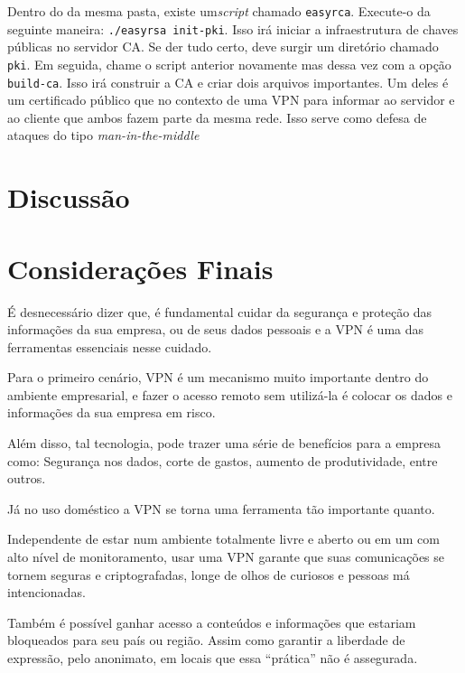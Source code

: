 \documentclass[12pt]{article}
\begin{document}
\begin{flushleft}
Dentro do da mesma pasta, existe um\emph{script} chamado \texttt{easyrca}. Execute-o da seguinte
maneira: \texttt{./easyrsa init-pki}. Isso irá iniciar a infraestrutura de chaves públicas no servidor CA.
Se der tudo certo, deve surgir um diretório chamado \texttt{pki}. Em seguida, chame o script anterior 
novamente mas dessa vez com a opção \texttt{build-ca}. Isso irá construir a CA e criar
dois arquivos importantes. Um deles é um certificado público que no contexto de uma VPN para informar
ao servidor e ao cliente que ambos fazem parte da mesma rede. Isso serve como defesa de ataques 
do tipo \emph{man-in-the-middle} 



\section{Discussão}


\section{Considerações Finais}

É desnecessário dizer que, é fundamental cuidar da segurança e proteção das informações da sua empresa, ou de seus dados pessoais e a VPN é uma das ferramentas essenciais nesse cuidado.

Para o primeiro cenário, VPN é um mecanismo muito importante dentro do ambiente empresarial, e fazer o acesso remoto sem utilizá-la é colocar os dados e informações da sua empresa em risco.

Além disso, tal tecnologia, pode trazer uma série de benefícios para a empresa como: Segurança nos dados, corte de gastos, aumento de produtividade, entre outros.

Já no uso doméstico a VPN se torna uma ferramenta tão importante quanto. 

Independente de estar num ambiente totalmente livre e aberto ou em um com alto nível de monitoramento, usar uma VPN garante que suas comunicações se tornem seguras e criptografadas, longe de olhos de curiosos e pessoas má intencionadas.

Também é possível ganhar acesso a conteúdos e informações que estariam bloqueados para seu país ou região. Assim como garantir a liberdade de expressão, pelo anonimato, em locais que essa “prática” não é assegurada. 


\end{flushleft}
\end{document}

